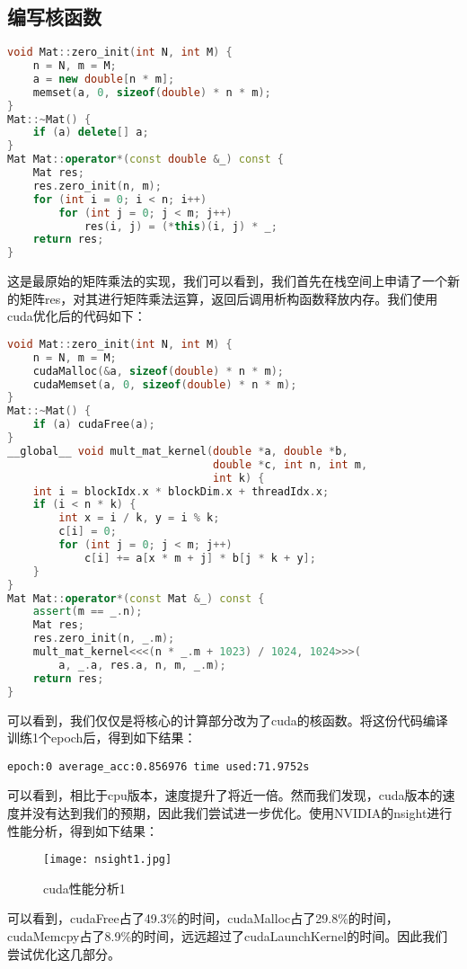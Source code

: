 \documentclass{ctexart}
\begin{document}
\begin{sloppypar}
\subsection{编写核函数}
\begin{lstlisting}[language=C++]
void Mat::zero_init(int N, int M) {
    n = N, m = M;
    a = new double[n * m];
    memset(a, 0, sizeof(double) * n * m);
}
Mat::~Mat() {
    if (a) delete[] a;
}
Mat Mat::operator*(const double &_) const {
    Mat res;
    res.zero_init(n, m);
    for (int i = 0; i < n; i++)
        for (int j = 0; j < m; j++)
            res(i, j) = (*this)(i, j) * _;
    return res;
}
\end{lstlisting}
这是最原始的矩阵乘法的实现，我们可以看到，我们首先在栈空间上申请了一个新的矩阵res，对其进行矩阵乘法运算，返回后调用析构函数释放内存。我们使用cuda优化后的代码如下：
\begin{lstlisting}[language=C++]
void Mat::zero_init(int N, int M) {
    n = N, m = M;
    cudaMalloc(&a, sizeof(double) * n * m);
    cudaMemset(a, 0, sizeof(double) * n * m);
}
Mat::~Mat() {
    if (a) cudaFree(a);
}
__global__ void mult_mat_kernel(double *a, double *b,
                                double *c, int n, int m,
                                int k) {
    int i = blockIdx.x * blockDim.x + threadIdx.x;
    if (i < n * k) {
        int x = i / k, y = i % k;
        c[i] = 0;
        for (int j = 0; j < m; j++)
            c[i] += a[x * m + j] * b[j * k + y];
    }
}
Mat Mat::operator*(const Mat &_) const {
    assert(m == _.n);
    Mat res;
    res.zero_init(n, _.m);
    mult_mat_kernel<<<(n * _.m + 1023) / 1024, 1024>>>(
        a, _.a, res.a, n, m, _.m);
    return res;
}
\end{lstlisting}
可以看到，我们仅仅是将核心的计算部分改为了cuda的核函数。将这份代码编译训练1个epoch后，得到如下结果：
\begin{lstlisting}
epoch:0 average_acc:0.856976 time used:71.9752s
\end{lstlisting}
可以看到，相比于cpu版本，速度提升了将近一倍。然而我们发现，cuda版本的速度并没有达到我们的预期，因此我们尝试进一步优化。使用NVIDIA的nsight进行性能分析，得到如下结果：

\begin{figure}[H]
    \centering
    \texttt{[image: nsight1.jpg]}
    \caption{cuda性能分析1}
\end{figure}

可以看到，cudaFree占了49.3\%的时间，cudaMalloc占了29.8\%的时间，cudaMemcpy占了8.9\%的时间，远远超过了cudaLaunchKernel的时间。因此我们尝试优化这几部分。

\end{sloppypar}
\end{document}
